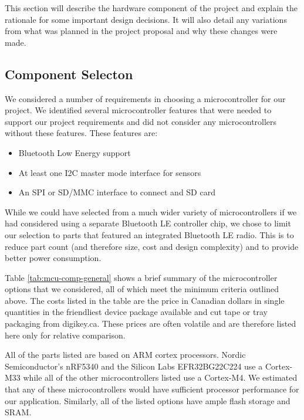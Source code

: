 This section will describe the hardware component of the project and explain 
the rationale for some important design decisions. It will also detail any 
variations from what was planned in the project proposal and why these changes
were made.

\subsection{Component Selecton}

We considered a number of requirements in choosing a microcontroller for our
project. We identified several microcontroller features that were needed to
support our project requirements and did not consider any microcontrollers
without these features. These features are:
\begin{itemize}
    \item Bluetooth Low Energy support
    \item At least one I2C master mode interface for sensors
    \item An SPI or SD/MMC interface to connect and SD card
\end{itemize}

While we could have selected from a much wider variety of microcontrollers if we
had considered using a separate Bluetooth LE controller chip, we chose to limit
our selection to parts that featured an integrated Bluetooth LE radio. This is
to reduce part count (and therefore size, cost and design complexity) and to
provide better power consumption.

Table \ref{tab:mcu-comp-general} shows a brief summary of the microcontroller
options that we considered, all of which meet the minimum criteria outlined
above. The costs listed in the table are the price in Canadian dollars in single
quantities in the friendliest device package available and cut tape or tray
packaging from digikey.ca. These prices are often volatile and are therefore
listed here only for relative comparison.

All of the parts listed are based on ARM cortex processors. Nordic
Semiconductor's nRF5340 and the Silicon Labs EFR32BG22C224 use a Cortex-M33
while all of the other microcontrollers listed use a Cortex-M4. We estimated that
any of these microcontrollers would have sufficient processor performance for
our application. Similarly, all of the listed options have ample flash storage
and SRAM.

